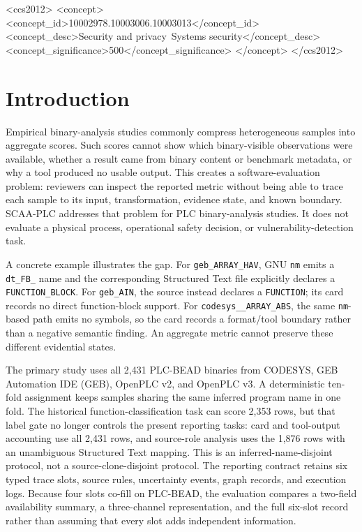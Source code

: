 \documentclass[manuscript,screen,review]{acmart}
\begin{document}
\begin{CCSXML}
<ccs2012>
<concept>
<concept_id>10002978.10003006.10003013</concept_id>
<concept_desc>Security and privacy~Systems security</concept_desc>
<concept_significance>500</concept_significance>
</concept>
</ccs2012>
\end{CCSXML}


\maketitle



\section{Introduction}

Empirical binary-analysis studies commonly compress heterogeneous samples into aggregate scores. Such scores cannot show which binary-visible observations were available, whether a result came from binary content or benchmark metadata, or why a tool produced no usable output. This creates a software-evaluation problem: reviewers can inspect the reported metric without being able to trace each sample to its input, transformation, evidence state, and known boundary. SCAA-PLC addresses that problem for PLC binary-analysis studies. It does not evaluate a physical process, operational safety decision, or vulnerability-detection task.

A concrete example illustrates the gap. For \texttt{geb\_ARRAY\_HAV}, GNU \texttt{nm} emits a \texttt{dt\_FB\_} name and the corresponding Structured Text file explicitly declares a \texttt{FUNCTION\_BLOCK}. For \texttt{geb\_AIN}, the source instead declares a \texttt{FUNCTION}; its card records no direct function-block support. For \texttt{codesys\_\_ARRAY\_ABS}, the same \texttt{nm}-based path emits no symbols, so the card records a format/tool boundary rather than a negative semantic finding. An aggregate metric cannot preserve these different evidential states.

The primary study uses all 2{,}431 PLC-BEAD binaries from CODESYS, GEB Automation IDE (GEB), OpenPLC v2, and OpenPLC v3. A deterministic ten-fold assignment keeps samples sharing the same inferred program name in one fold. The historical function-classification task can score 2{,}353 rows, but that label gate no longer controls the present reporting tasks: card and tool-output accounting use all 2{,}431 rows, and source-role analysis uses the 1{,}876 rows with an unambiguous Structured Text mapping. This is an inferred-name-disjoint protocol, not a source-clone-disjoint protocol. The reporting contract retains six typed trace slots, source rules, uncertainty events, graph records, and execution logs. Because four slots co-fill on PLC-BEAD, the evaluation compares a two-field availability summary, a three-channel representation, and the full six-slot record rather than assuming that every slot adds independent information.
\end{document}
